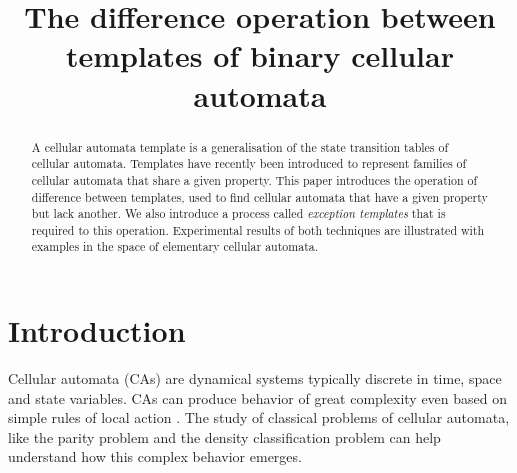 \documentclass{llncs}
\begin{document}
\pagestyle{headings}  %

\title{The difference operation between templates of binary cellular automata}






\maketitle

\begin{abstract}
A cellular automata template is a generalisation of the state transition tables of cellular automata. Templates have recently been introduced to represent families of cellular automata that share a given property. This paper introduces the operation of difference between templates, used to find cellular automata that have a given property but lack another. We also introduce a process called \textit{exception templates} that is required to this operation. Experimental results of both techniques are illustrated with examples in the space of elementary cellular automata.
\end{abstract}
%
\section{Introduction}
\label{sec:introducao}
Cellular automata (CAs) are dynamical systems typically discrete in time, space and state variables.
CAs can produce behavior of great complexity even based on simple rules of local action \cite{wolfram2002}. The study of classical problems of cellular automata, like the parity problem \cite{Betel2013} and the density classification problem \cite{deOliveira2014density} can help understand how this complex behavior emerges.
\end{document}
